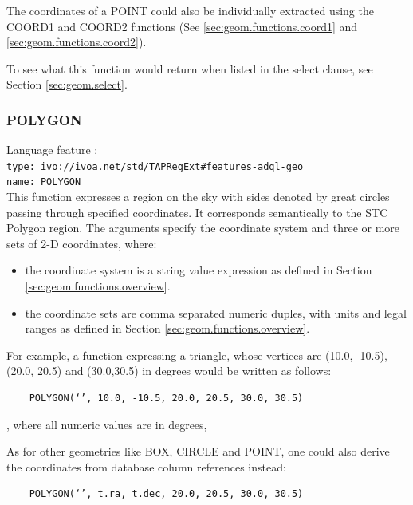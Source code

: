 \documentclass[11pt,a4paper]{ivoa}
\begin{document}
The coordinates of a POINT could also be individually extracted using the
COORD1 and COORD2 functions (See \ref{sec:geom.functions.coord1} and
\ref{sec:geom.functions.coord2}).

To see what this function would return when listed in the select clause,
see Section \ref{sec:geom.select}.

\subsubsection{POLYGON}
\label{sec:geom.functions.polygon}
{\footnotesize Language feature :}\\
{\footnotesize \verb|type: ivo://ivoa.net/std/TAPRegExt#features-adql-geo|}\\
{\footnotesize \verb|name: POLYGON|}\\

This function expresses a region on the sky with sides denoted by great
circles passing through specified coordinates. It corresponds semantically
to the STC Polygon region. The arguments specify the
coordinate system and three or more sets of 2-D coordinates, where:

\begin{itemize}
    \item the coordinate system is a string value expression as defined in Section \ref{sec:geom.functions.overview}.
    \item the coordinate sets are comma separated numeric duples, with units and legal ranges as defined in Section \ref{sec:geom.functions.overview}.
\end{itemize}

For example, a function expressing a triangle, whose vertices are (10.0,
-10.5), (20.0, 20.5) and (30.0,30.5) in degrees would be written
as follows:

\begin{verbatim}
    POLYGON(‘’, 10.0, -10.5, 20.0, 20.5, 30.0, 30.5)
\end{verbatim}
    
, where all numeric values are in degrees,

As for other geometries like BOX, CIRCLE and POINT, one could also derive
the coordinates from database column references instead:

\begin{verbatim}
    POLYGON(‘’, t.ra, t.dec, 20.0, 20.5, 30.0, 30.5)
\end{verbatim}
\end{document}

